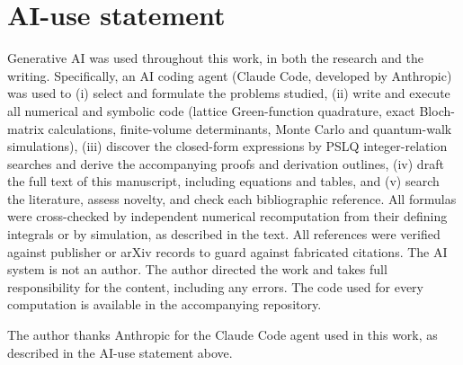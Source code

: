 \documentclass[aps,pre,10pt,twocolumn,superscriptaddress,nofootinbib]{revtex4-2}
\begin{document}
\section*{AI-use statement}
Generative AI was used throughout this work, in both the research and the writing. Specifically,
an AI coding agent (Claude Code, developed by Anthropic) was used to
(i) select and formulate the problems studied,
(ii) write and execute all numerical and symbolic code (lattice Green-function quadrature,
exact Bloch-matrix calculations, finite-volume determinants, Monte Carlo and quantum-walk
simulations),
(iii) discover the closed-form expressions by PSLQ integer-relation searches and derive the
accompanying proofs and derivation outlines,
(iv) draft the full text of this manuscript, including equations and tables, and
(v) search the literature, assess novelty, and check each bibliographic reference.
All formulas were cross-checked by independent numerical recomputation from their defining
integrals or by simulation, as described in the text. All references were verified against
publisher or arXiv records to guard against fabricated citations. The AI system is not an
author. The author directed the work and takes full responsibility for the content, including
any errors. The code used for every computation is available in the accompanying repository.

\begin{acknowledgments}
The author thanks Anthropic for the Claude Code agent used in this work, as described in the
AI-use statement above.
\end{acknowledgments}
\end{document}
